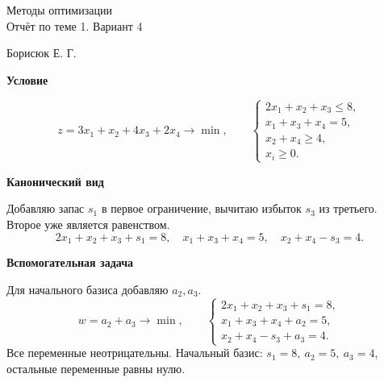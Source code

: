 \documentclass[12pt,a4paper]{article}
\begin{document}
\begin{center}\large Методы оптимизации\\Отчёт по теме 1. Вариант 4\end{center}
Борисюк Е. Г.
\par\textbf{Условие}\par
\[
z=3x_1+x_2+4x_3+2x_4\to\min,\qquad
\begin{cases}
2x_1+x_2+x_3\le8,\\
x_1+x_3+x_4=5,\\
x_2+x_4\ge4,\\
x_i\ge0.
\end{cases}
\]
\par\textbf{Канонический вид}\par

Добавляю запас $s_1$ в первое ограничение, вычитаю избыток $s_3$ из третьего. Второе уже является равенством.
\[
2x_1+x_2+x_3+s_1=8,\quad
x_1+x_3+x_4=5,\quad
x_2+x_4-s_3=4.
\]
\par\textbf{Вспомогательная задача}\par

Для начального базиса добавляю $a_2,a_3$.
\[
w=a_2+a_3\to\min,\qquad
\begin{cases}
2x_1+x_2+x_3+s_1=8,\\
x_1+x_3+x_4+a_2=5,\\
x_2+x_4-s_3+a_3=4.
\end{cases}
\]
Все переменные неотрицательны. Начальный базис:
$s_1=8,\ a_2=5,\ a_3=4$, остальные переменные равны нулю.
\end{document}
